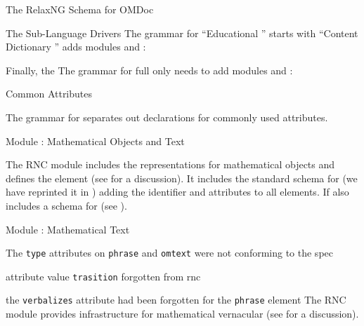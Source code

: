 \begin{tchapter}[id=rnc]{The RelaxNG Schema for OMDoc}
\begin{tsection}[id=rnc:drivers]{The Sub-Language Drivers}
  The {\relaxng} grammar for ``Educational {\omdoc}'' starts with ``Content Dictionary
  {\omdoc}'' adds modules {} and {}:

  

  Finally, the The {\relaxng} grammar for full {\omdoc} only needs to add modules
 {} and {}:

  
\end{tsection}

\begin{tsection}[id=rnc:attributes]{Common Attributes}
  
  The {\relaxng} grammar for {\omdoc} separates out declarations for commonly used
  attributes.

  
\end{tsection}

\begin{tsection}[id=rnc:math]{Module {}: Mathematical Objects and Text}
  
  The RNC module {} includes the representations for mathematical objects
  and defines the {} element (see {} for a discussion). It
  includes the standard {\relaxng} schema for {\openmath} (we have reprinted it in
  {}) adding the {\omdoc} identifier and {\css}
  attributes to all elements. If also includes a schema for {\mathml}
  (see {}).


\end{tsection}

\begin{tsection}[id=rnc:mtxt]{Module {}: Mathematical Text}
  
\begin{erratum}[reported-by=Christoph Lange,date=2010-08-22]{The {\texttt{type}}
    attributes on {\texttt{phrase}} and {\texttt{omtext}} were not conforming to the spec}
\begin{erratum}[reported-by=Kristina Sojakova,date=2006-07-21]{attribute value
    {\texttt{trasition}} forgotten from rnc}
\begin{erratum}[reported-by=Michael Kohlhase,date=2008-07-01]{the {\texttt{verbalizes}}
    attribute had been forgotten for the {\texttt{phrase}} element}
  The RNC module {} provides infrastructure for mathematical
  vernacular (see {} for a discussion).


\end{erratum}
\end{erratum}
\end{erratum}
\end{tsection}
\end{tchapter}
